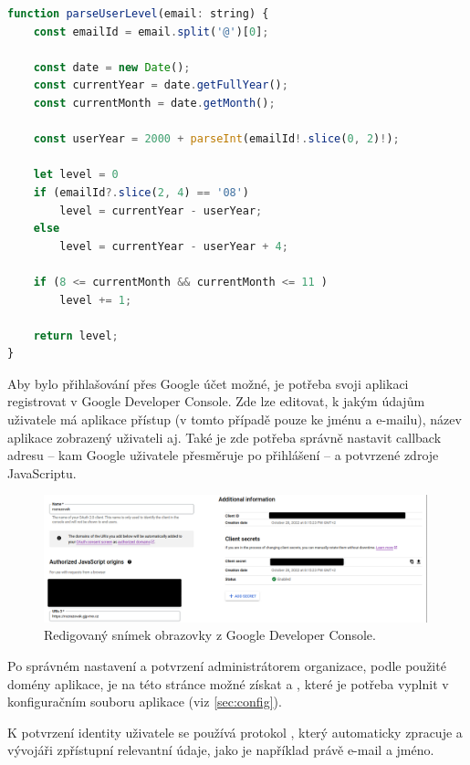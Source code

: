 \begin{lstlisting}[language=JavaScript,caption={Úryvek \M{/src/pages/api/auth/[...nextauth].ts}; zjištění aktuálního ročníku uživatele.}]
function parseUserLevel(email: string) {
    const emailId = email.split('@')[0];
    
    const date = new Date();
    const currentYear = date.getFullYear();
    const currentMonth = date.getMonth();
    
    const userYear = 2000 + parseInt(emailId!.slice(0, 2)!);
    
    let level = 0
    if (emailId?.slice(2, 4) == '08')
        level = currentYear - userYear;
    else
        level = currentYear - userYear + 4;
    
    if (8 <= currentMonth && currentMonth <= 11 )
        level += 1;
    
    return level;
}
\end{lstlisting}

Aby bylo přihlašování přes Google účet možné, je potřeba svoji aplikaci registrovat v Google Developer Console. Zde lze editovat, k jakým údajům uživatele má aplikace přístup (v tomto případě pouze ke jménu a e-mailu), název aplikace zobrazený uživateli aj. Také je zde potřeba správně nastavit callback adresu -- kam Google uživatele přesměruje po přihlášení -- a potvrzené zdroje JavaScriptu.

\begin{figure}[H]
    \centering
    \includegraphics[width=420px]{images/02technologie/google-console.png}
    \caption{Redigovaný snímek obrazovky z Google Developer Console.}
\end{figure}

Po správném nastavení a potvrzení administrátorem organizace, podle použité domény aplikace, je na této stránce možné získat  a , které je potřeba vyplnit v konfiguračním souboru aplikace (viz \ref{sec:config}).

K potvrzení identity uživatele se používá protokol , který  automaticky zpracuje a vývojáři zpřístupní relevantní údaje, jako je například právě e-mail a jméno.

